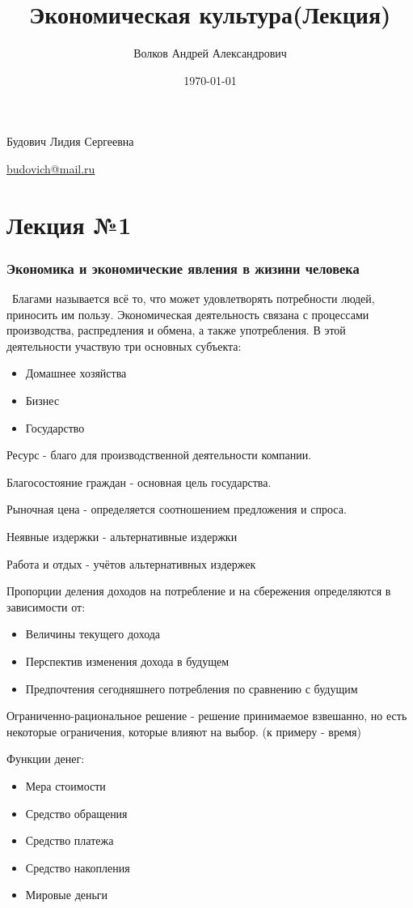 \documentclass[a4paper, 12pt]{article}
\author{Волков Андрей Александрович}
\title{Экономическая культура(Лекция)}
\date{\today}
\begin{document}
	\maketitle
	Будович Лидия Сергеевна
	
	\href{budovich@mail.ru}{budovich@mail.ru}
	
	\part{Лекция №1}
	
	\section{Экономика и экономические явления в жизини человека}
	
	\quad \, Благами называется всё то, что может удовлетворять потребности людей, приносить им пользу. Экономическая деятельность связана с процессами производства, распредления и обмена, а также употребления. В этой деятельности участвую три основных субъекта:
	\begin{itemize}
		\item Домашнее хозяйства
		\item Бизнес
		\item Государство
	\end{itemize}

	Ресурс - благо для производственной деятельности компании.
	
	Благосостояние граждан - основная цель государства.
	
	Рыночная цена - определяется соотношением предложения и спроса.
	
	Неявные издержки - альтернативные издержки
	
	Работа и отдых - учётов альтернативных издержек
	
	Пропорции деления доходов на потребление и на сбережения определяются в зависимости от:
	\begin{itemize}
		\item Величины текущего дохода
		\item Перспектив изменения дохода в будущем
		\item Предпочтения сегодняшнего потребления по сравнению с будущим
	\end{itemize}

	Ограниченно-рациональное решение - решение принимаемое взвешанно, но есть некоторые ограничения, которые влияют на выбор. (к примеру - время)


	Функции денег:
	\begin{itemize}
		\item Мера стоимости
		\item Средство обращения
		\item Средство платежа
		\item Средство накопления
		\item Мировые деньги
	\end{itemize}
\end{document}
